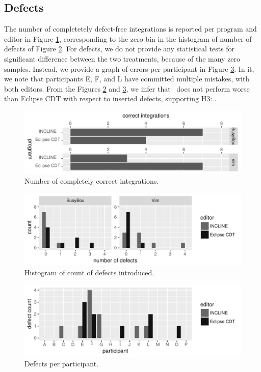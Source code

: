 \subsection{Defects}
The number of completetely defect-free integrations is reported per program and editor in Figure \ref{fig:correct-ans}, corresponding to the zero bin in the histogram of number of defects of Figure \ref{fig:defects-hist}. For defects, we do not provide any statistical tests for significant difference between the two treatments, because of the many zero samples. Instead, we provide a graph of errors per participant in Figure \ref{fig:paricipant-errors}. In it, we note that participants E, F, and L have committed multiple mistakes, with both editors. From the Figures \ref{fig:defects-hist} and \ref{fig:paricipant-errors}, we infer that \tooln~does not perform worse than Eclipse CDT with respect to inserted defects, supporting H3: \textit{\HC}.

\begin{figure}
    \centering
    \includegraphics{figure/incl-correct-ans-r.pdf}
    \caption{Number of completely correct integrations.}
    \label{fig:correct-ans}
\end{figure}

\begin{figure}
    \centering
    \includegraphics{figure/incl-correct-histo.pdf}
    \caption{Histogram of count of defects introduced.}
    \label{fig:defects-hist}
\end{figure}

\begin{figure}
    \centering
    \includegraphics{figure/incl-par-errors.pdf}
    \caption{Defects per participant.}
    \label{fig:paricipant-errors}
\end{figure}


